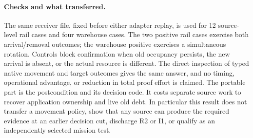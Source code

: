 \documentclass[11pt]{article}
\begin{document}
\paragraph{Checks and what transferred.}
The same receiver file, fixed before either adapter replay, is used for 12 source-level rail cases and four warehouse cases. The two positive rail cases exercise both arrival/removal outcomes; the warehouse positive exercises a simultaneous rotation. Controls block confirmation when old occupancy persists, the new arrival is absent, or the actual resource is different. The direct inspection of typed native movement and target outcomes gives the same answer, and no timing, operational advantage, or reduction in total proof effort is claimed. The portable part is the postcondition and its decision code. It costs separate source work to recover application ownership and live old debt. In particular this result does not transfer a movement policy, show that any source can produce the required evidence at an earlier decision cut, discharge R2 or I1, or qualify as an independently selected mission test.
\end{document}
